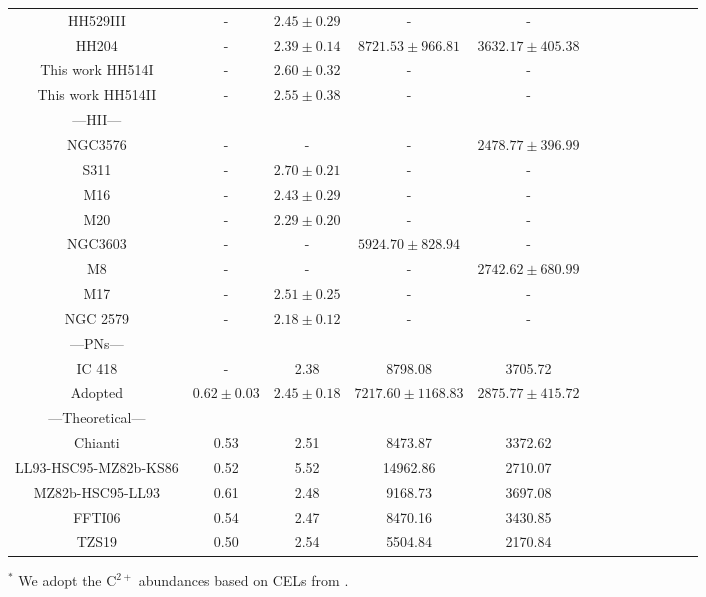 \documentclass[fleqn,usenatbib]{mnras}
\begin{document}
\begin{table}
\begin{tabular}{ccccccccccccc}
\citet{mendez2021} HH529III &-&$2.45 \pm 0.29$ & - & -\\


\citet{mendez2021-2} HH204 & - & $2.39 \pm 0.14$ & $8721.53 \pm 966.81$ & $3632.17 \pm 405.38$\\

This work HH514I & - & $2.60 \pm 0.32$ &-&-\\

This work HH514II & - & $2.55 \pm 0.38$ &-&-\\



---HII---\\

\citet{garciarojas04} NGC3576 & -& - & - & $2478.77 \pm 396.99$ \\

\citet{garciarojas05} S311& - & $2.70\pm 0.21$&-&-\\

\citet{garciarojas06} M16 &-&$ 2.43\pm 0.29$&-&-\\

\citet{garciarojas06} M20 & -& $ 2.29\pm 0.20$&-&-\\

\citet{garciarojas06} NGC3603 & - & - & $5924.70 \pm 828.94$ & - \\

\citet{garciarojas07-2} M8 &-& - &- & $2742.62 \pm 680.99$  \\

\citet{garciarojas07-2} M17 &-& $2.51 \pm 0.25$ &-&-\\

\citet{Esteban13} NGC 2579 &- &$2.18 \pm 0.12$ &-&-\\


---PNs---\\

\citet{Sharpee03} IC 418 & -& 2.38 & 8798.08 & 3705.72\\


Adopted & \boldmath $0.62 \pm 0.03$ & \boldmath $2.45 \pm 0.18$& \boldmath$ 7217.60\pm 1168.83$ & \boldmath $2875.77\pm415.72$\\


---Theoretical---\\

Chianti & 0.53&2.51&8473.87&3372.62&\\
LL93-HSC95-MZ82b-KS86 &0.52& 5.52&14962.86&2710.07\\
MZ82b-HSC95-LL93  & 0.61 & 2.48 &9168.73&3697.08\\
FFTI06 &0.54& 2.47&8470.16&3430.85\\
TZS19 & 0.50 & 2.54&5504.84&2170.84\\

\hline
\end{tabular}
\begin{description}
\item $^*$ We adopt the C$^{2+}$ abundances based on CELs from \citet{walter92}. \\
\end{description}
\end{table}
\end{document}
